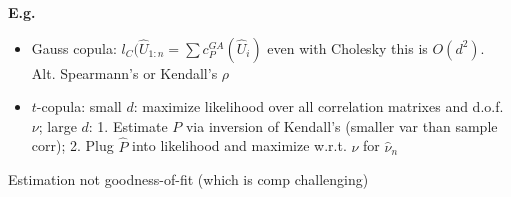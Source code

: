 \textbf{E.g.}
\begin{itemize}
    \item Gauss copula: $l_C(\hat U_{1:n}=\sum c^{GA}_P(\hat U_i)$ even with Cholesky this is $O(d^2)$. Alt. Spearmann's or Kendall's $\rho$
    \item $t$-copula: small $d$: maximize likelihood over all correlation matrixes and d.o.f. $\nu$; large $d$: 1. Estimate $P$ via inversion of Kendall's (smaller var than sample corr); 2. Plug $\hat P$ into likelihood and maximize w.r.t. $\nu$ for $\hat\nu_n$
\end{itemize}



Estimation not goodness-of-fit (which is comp challenging)